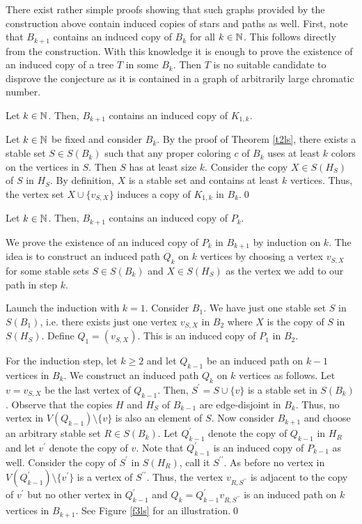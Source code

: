 There exist rather simple proofs showing that such graphs provided by the construction above contain induced copies of stars and paths as well.
First, note that $B_{k+1}$ contains an induced copy of $B_k$ for all $k\in\mathbb{N}$. This follows directly from the construction. With this knowledge it is enough to prove the existence of an induced copy of a tree $T$ in some $B_k$. Then $T$ is no suitable candidate to disprove the conjecture as it is contained in a graph of arbitrarily large chromatic number.

\begin{thm}
Let $k\in\mathbb{N}$. Then, $B_{k+1}$ contains an induced copy of $K_{1,k}$.
\end{thm}
\begin{prf}
Let $k\in\mathbb{N}$ be fixed and consider $B_k$. By the proof of Theorem \ref{t2ls}, there exists a stable set $S\in S(B_k)$ such that any proper coloring $c$ of $B_k$ uses at least $k$ colors on the vertices in $S$. Then $S$ has at least size $k$. Consider the copy $X\in S(H_S)$ of $S$ in $H_S$. By definition, $X$ is a stable set and contains at least $k$ vertices. Thus, the vertex set $X\cup \lbrace v_{S,X}\rbrace$ induces a copy of $K_{1,k}$ in $B_k$.\qed   
\end{prf}

\begin{thm}\label{t3ls}
Let $k\in\mathbb{N}$. Then, $B_{k+1}$ contains an induced copy of $P_k$.
\end{thm}
\begin{prf}
We prove the existence of an induced copy of $P_k$ in $B_{k+1}$ by induction on $k$. The idea is to construct an induced path $Q_k$ on $k$ vertices by choosing a vertex $v_{S,X}$ for some stable sets $S\in S(B_k)$ and $X\in S(H_S)$ as the vertex we add to our path in step $k$.

Launch the induction with $k=1$. Consider $B_1$. We have just one stable set $S$ in $S(B_1)$, i.e. there exists just one vertex $v_{S,X}$ in $B_2$ where $X$ is the copy of $S$ in $S(H_S)$. Define $Q_1=(v_{S,X})$. This is an induced copy of $P_1$  in $B_2$.

For the induction step, let $k\geq 2$ and let $Q_{k-1}$ be an induced path on $k-1$ vertices in $B_k$. We construct an induced path $Q_k$ on $k$ vertices as follows. Let $v=v_{S,X}$ be the last vertex of $Q_{k-1}$. Then, $S^\prime = S\cup \lbrace v\rbrace$ is a stable set in $S(B_k)$. Observe that the copies $H$ and $H_S$ of $B_{k-1}$ are edge-disjoint in $B_k$. Thus, no vertex in $V(Q_{k-1})\setminus\lbrace v\rbrace$ is also an element of $S$. Now consider $B_{k+1}$ and choose an arbitrary stable set $R\in S(B_k)$. Let $Q_{k-1}^\prime$ denote the copy of $Q_{k-1}$ in $H_R$ and let $v^\prime$ denote the copy of $v$. Note that $Q_{k-1}^\prime$ is an induced copy of $P_{k-1}$ as well. Consider the copy of $S^\prime$ in $S(H_R)$, call it $S^{\prime\prime}$. As before no vertex in $V(Q_{k-1}^\prime )\setminus\lbrace v^\prime\rbrace$ is a vertex of $S^{\prime\prime}$. Thus, the vertex $v_{R,S^{\prime\prime}}$ is adjacent to the copy of $v^\prime$ but no other vertex in $Q_{k-1}^\prime$ and $Q_k=Q_{k-1}^\prime v_{R,S^{\prime\prime}}$ is an induced path on $k$ vertices in $B_{k+1}$. See Figure \ref{f3ls} for an illustration.\qed
\end{prf}

